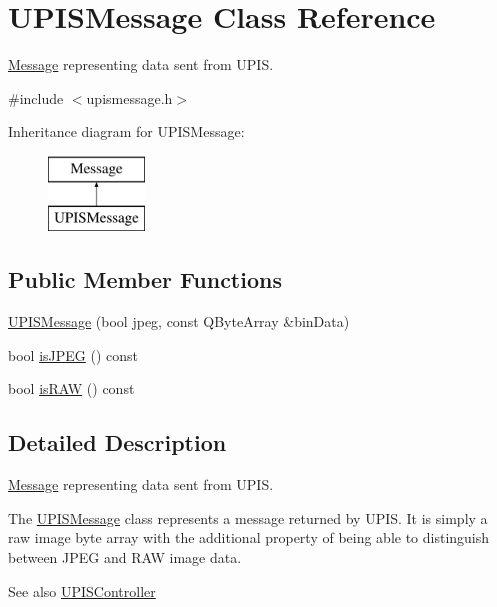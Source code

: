\hypertarget{classUPISMessage}{
\section{UPISMessage Class Reference}
\label{classUPISMessage}
}


\hyperlink{classMessage}{Message} representing data sent from UPIS.  




{\ttfamily \#include $<$upismessage.h$>$}

Inheritance diagram for UPISMessage:\begin{figure}[H]
\begin{center}
\leavevmode
\includegraphics[height=2.000000cm]{classUPISMessage}
\end{center}
\end{figure}
\subsection*{Public Member Functions}
\begin{DoxyCompactItemize}
\item 
\hyperlink{classUPISMessage_aa3cb85cd725551f1bc74f09413f8e9f2}{UPISMessage} (bool jpeg, const QByteArray \&binData)
\item 
bool \hyperlink{classUPISMessage_a48073be902fb18f8240a1eae81636cb8}{isJPEG} () const 
\item 
bool \hyperlink{classUPISMessage_a71b6912bd6db1175d9102a730af2e724}{isRAW} () const 
\end{DoxyCompactItemize}


\subsection{Detailed Description}
\hyperlink{classMessage}{Message} representing data sent from UPIS. 

The \hyperlink{classUPISMessage}{UPISMessage} class represents a message returned by UPIS. It is simply a raw image byte array with the additional property of being able to distinguish between JPEG and RAW image data.

\begin{DoxySeeAlso}{See also}
\hyperlink{classUPISController}{UPISController} 
\end{DoxySeeAlso}


